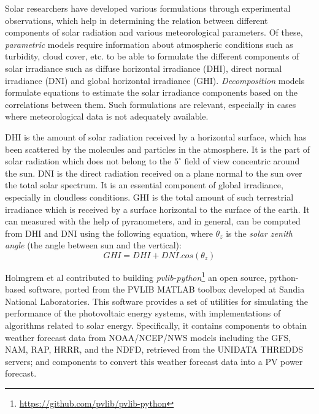 \par Solar researchers have developed various formulations through experimental observations, which help in determining the relation between different components of solar radiation and various meteorological parameters. Of these, \textit{parametric} models require information about atmospheric conditions such as turbidity, cloud cover, etc. to be able to formulate the different components of solar irradiance such as diffuse horizontal irradiance (DHI), direct normal irradiance (DNI) and global horizontal irradiance (GHI). \textit{Decomposition} models formulate equations to estimate the solar irradiance components based on the correlations between them. Such formulations are relevant, especially in cases where meteorological data is not adequately available.

\par DHI is the amount of solar radiation received by a horizontal surface, which has been scattered by the molecules and particles in the atmosphere. It is the part of solar radiation which does not belong to the $5^{\circ}$ field of view concentric around the sun. DNI is the direct radiation received on a plane normal to the sun over the total solar spectrum. It is an essential component of global irradiance, especially in cloudless conditions. GHI is the total amount of such terrestrial irradiance which is received by a surface horizontal to the surface of the earth. It can measured with the help of pyranometers, and in general, can be computed from DHI and DNI using the following equation, where $\theta_z$ is the \textit{solar zenith angle} (the angle between sun and the vertical):
\begin{equation}\label{eq:ghi}
    GHI = DHI + DNI . cos(\theta_z)
\end{equation}

\par Holmgrem et al \cite{pvlib_Holmgren2018} contributed to building \textit{pvlib-python}\footnote{\url{https://github.com/pvlib/pvlib-python}} an open source, python-based software, ported from the PVLIB MATLAB toolbox developed at Sandia National Laboratories. This software provides a set of utilities for simulating the performance of the photovoltaic energy systems, with implementations of algorithms related to solar energy. Specifically, it contains components to obtain weather forecast data from NOAA/NCEP/NWS models including the GFS, NAM, RAP, HRRR, and the NDFD, retrieved from the UNIDATA THREDDS servers; and components to convert this weather forecast data into a PV power forecast.

